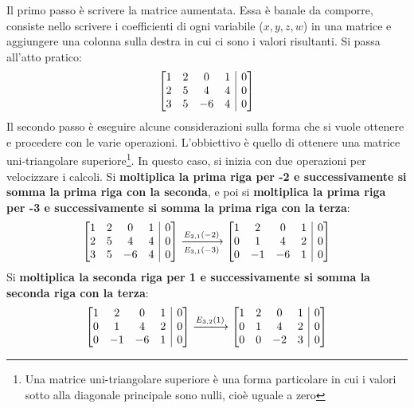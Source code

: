 \documentclass[a4paper]{article}
\makeatletter
\newenvironment{rowequmatbra}[1]{\left[\array{@{}#1@{}}}{\endarray\right]}
\makeatother
\begin{document}
	\noindent
	Il \textcolor{Red3}{primo passo} è scrivere la matrice aumentata. Essa è banale da comporre, consiste nello scrivere i coefficienti di ogni variabile ($x,y,z,w$) in una matrice e aggiungere una colonna sulla destra in cui ci sono i valori risultanti. Si passa all'atto pratico:
	\begin{equation*}
		\begin{rowequmatbra}{cccc|c}
			1  &  2 &  0 &  1 & 0 	\\
			2  &  5 &  4 &  4 & 0	\\
			3  &  5 & -6 &  4 & 0
		\end{rowequmatbra}
	\end{equation*}
	Il \textcolor{Red3}{secondo passo} è eseguire alcune considerazioni sulla forma che si vuole ottenere e procedere con le varie operazioni. L'obbiettivo è quello di ottenere una matrice uni-triangolare superiore\footnote{Una matrice uni-triangolare superiore è una forma particolare in cui i valori sotto alla diagonale principale sono nulli, cioè uguale a zero}. In questo caso, si inizia con due operazioni per velocizzare i calcoli. Si \textbf{moltiplica la prima riga per -2 e successivamente si somma la prima riga con la seconda}, e poi si \textbf{moltiplica la prima riga per -3 e successivamente si somma la prima riga con la terza}:
	\begin{equation*}
		\begin{rowequmatbra}{cccc|c}
			1  &  2 &  0 &  1 & 0 	\\
			2  &  5 &  4 &  4 & 0	\\
			3  &  5 & -6 &  4 & 0
		\end{rowequmatbra} \xlongrightarrow[E_{3,1}\left(-3\right)]{E_{2,1}\left(-2\right)}
		\begin{rowequmatbra}{cccc|c}
			1  &  2 &  0 &  1 & 0 	\\
			0  &  1 &  4 &  2 & 0	\\
			0  & -1 & -6 &  1 & 0
		\end{rowequmatbra}
	\end{equation*}
	Si \textbf{moltiplica la seconda riga per 1 e successivamente si somma la seconda riga con la terza}:
	\begin{equation*}
		\begin{rowequmatbra}{cccc|c}
			1  &  2 &  0 &  1 & 0 	\\
			0  &  1 &  4 &  2 & 0	\\
			0  & -1 & -6 &  1 & 0
		\end{rowequmatbra} \xlongrightarrow{E_{3,2}\left(1\right)}
		\begin{rowequmatbra}{cccc|c}
			1  &  2 &  0 &  1 & 0 	\\
			0  &  1 &  4 &  2 & 0	\\
			0  &  0 & -2 &  3 & 0
		\end{rowequmatbra}
	\end{equation*}
\end{document}
